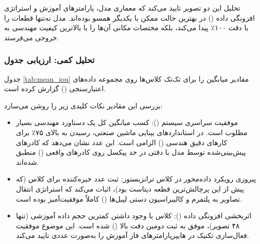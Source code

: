 \documentclass{article}
\begin{document}
تحلیل این دو تصویر تایید می‌کند که معماری مدل، پارامترهای آموزش و استراتژی افزونگی داده () در بهترین حالت ممکن با یکدیگر همسو بوده‌اند. مدل نه‌تنها قطعات را با دقت ۱۰۰٪ پیدا می‌کند، بلکه مختصات مکانی آن‌ها را با بالاترین کیفیت مهندسی به خروجی می‌فرستد.


\subsubsection{تحلیل کمی: ارزیابی جدول }

جدول \ref{tab:mean_iou} مقادیر میانگین  را برای تک‌تک کلاس‌ها روی مجموعه داده‌های اعتبارسنجی () گزارش کرده است.

\begin{table}[htbp]
	\centering
	\caption{خلاصه نتایج ارزیابی متریک  به تفکیک کلاس‌ها روی داده‌های اعتبارسنجی}
	\label{tab:mean_iou}
	\vspace{2mm}
\end{table}

بررسی این مقادیر نکات کلیدی زیر را روشن می‌سازد:

\begin{itemize}
	\item موفقیت سراسری سیستم (): کسب میانگین کل  یک دستاورد مهندسی بسیار مطلوب است. در استانداردهای بینایی ماشین صنعتی، رسیدن به  بالای ۷۵٪ برای کارهای دقیق هندسی () الزامی است. این عدد نشان می‌دهد که کادرهای پیش‌بینی‌شده توسط مدل با دقتی در حد پیکسل روی کادرهای واقعی () منطبق شده‌اند.
	\item پیروزی رویکرد داده‌محور در کلاس ترانزیستور: ثبت عدد خیره‌کننده  برای کلاس  (که پیش از این پرچالش‌ترین قطعه دیتاست بود)، اثبات می‌کند که استراتژی انتقال تصاویر به پلتفرم  و کالیبراسیون دستی لیبل‌ها () کاملاً موفقیت‌آمیز بوده است.
	\item اثربخشی افزونگی داده (): کلاس  با وجود داشتن کمترین حجم داده آموزشی (تنها ۴۸ تصویر)، موفق به ثبت دومین دقت بالا () شده است. این موضوع موفقیت فعال‌سازی تکنیک  در هایپرپارامترهای فاز آموزش را به‌صورت عددی تایید می‌کند.
\end{itemize}
\end{document}
